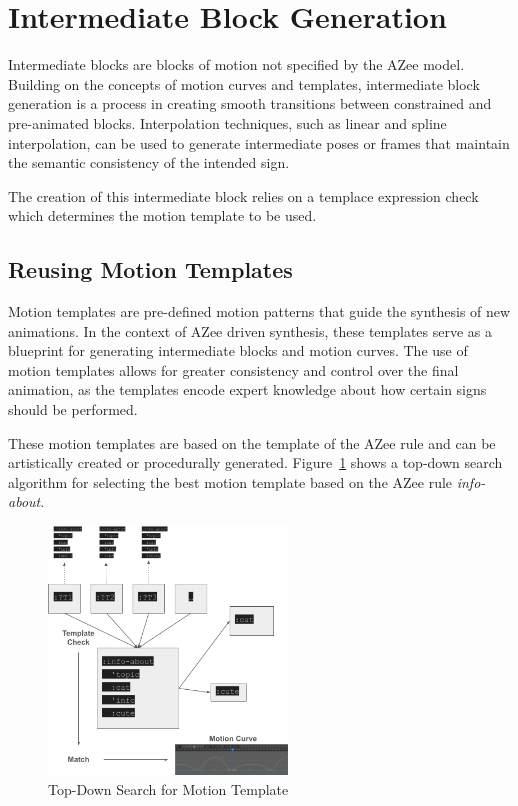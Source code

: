 \documentclass[../../main.tex]{subfiles}
\begin{document}
\section{Intermediate Block Generation}
\label{ch:intermediate_blocks:intermediate_block_generation}

Intermediate blocks are blocks of motion not specified by the AZee model. Building on the concepts of motion curves and templates, intermediate block generation is a process in creating smooth transitions between constrained and pre-animated blocks. Interpolation techniques, such as linear and spline interpolation, can be used to generate intermediate poses or frames that maintain the semantic consistency of the intended sign.

The creation of this intermediate block relies on a templace expression check which determines the motion template to be used. 

\subsection{Reusing Motion Templates}
\label{ch:intermediate_blocks:reusing_motion_templates}

Motion templates are pre-defined motion patterns that guide the synthesis of new animations. In the context of AZee driven synthesis, these templates serve as a blueprint for generating intermediate blocks and motion curves. The use of motion templates allows for greater consistency and control over the final animation, as the templates encode expert knowledge about how certain signs should be performed.

These motion templates are based on the template of the AZee rule and can be artistically created or procedurally generated. Figure~\ref{fig:top_down_search_template} shows a top-down search algorithm for selecting the best motion template based on the AZee rule \emph{info-about}.

\begin{figure}
    \centering \includegraphics[width = 2.5in]{chapters/intermediate_blocks/images/top_down_search_template.png}
    \caption{Top-Down Search for Motion Template}
    \label{fig:top_down_search_template}
\end{figure}
\end{document}
